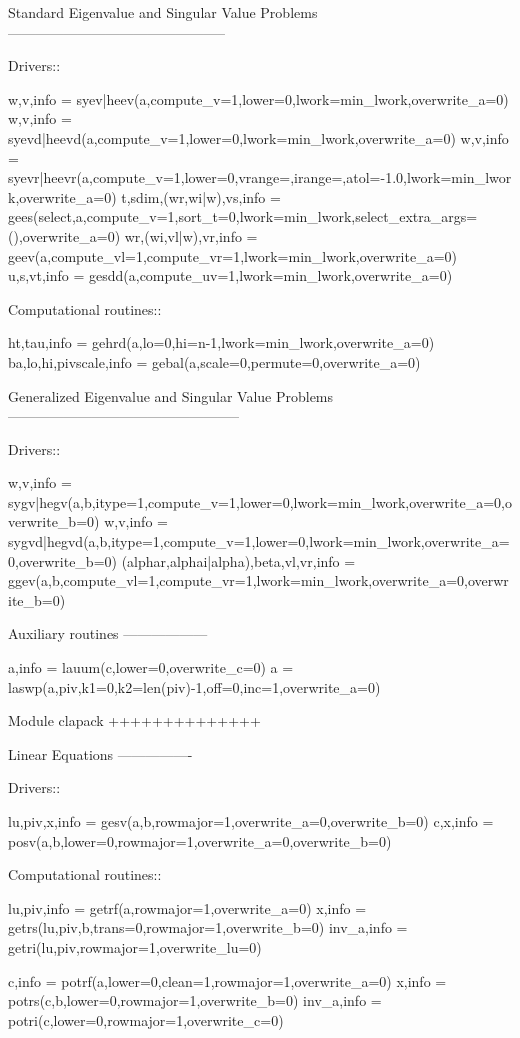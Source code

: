 \begin{DoxyVerb}
Standard Eigenvalue and Singular Value Problems
-----------------------------------------------

  Drivers::

    w,v,info = syev|heev(a,compute_v=1,lower=0,lwork=min_lwork,overwrite_a=0)
    w,v,info = syevd|heevd(a,compute_v=1,lower=0,lwork=min_lwork,overwrite_a=0)
    w,v,info = syevr|heevr(a,compute_v=1,lower=0,vrange=,irange=,atol=-1.0,lwork=min_lwork,overwrite_a=0)
    t,sdim,(wr,wi|w),vs,info = gees(select,a,compute_v=1,sort_t=0,lwork=min_lwork,select_extra_args=(),overwrite_a=0)
    wr,(wi,vl|w),vr,info = geev(a,compute_vl=1,compute_vr=1,lwork=min_lwork,overwrite_a=0)
    u,s,vt,info = gesdd(a,compute_uv=1,lwork=min_lwork,overwrite_a=0)

  Computational routines::

    ht,tau,info = gehrd(a,lo=0,hi=n-1,lwork=min_lwork,overwrite_a=0)
    ba,lo,hi,pivscale,info = gebal(a,scale=0,permute=0,overwrite_a=0)

Generalized Eigenvalue and Singular Value Problems
--------------------------------------------------

  Drivers::

    w,v,info = sygv|hegv(a,b,itype=1,compute_v=1,lower=0,lwork=min_lwork,overwrite_a=0,overwrite_b=0)
    w,v,info = sygvd|hegvd(a,b,itype=1,compute_v=1,lower=0,lwork=min_lwork,overwrite_a=0,overwrite_b=0)
    (alphar,alphai|alpha),beta,vl,vr,info = ggev(a,b,compute_vl=1,compute_vr=1,lwork=min_lwork,overwrite_a=0,overwrite_b=0)


Auxiliary routines
------------------

  a,info = lauum(c,lower=0,overwrite_c=0)
  a = laswp(a,piv,k1=0,k2=len(piv)-1,off=0,inc=1,overwrite_a=0)

Module clapack
++++++++++++++

Linear Equations
----------------

  Drivers::

    lu,piv,x,info = gesv(a,b,rowmajor=1,overwrite_a=0,overwrite_b=0)
    c,x,info = posv(a,b,lower=0,rowmajor=1,overwrite_a=0,overwrite_b=0)

  Computational routines::

    lu,piv,info = getrf(a,rowmajor=1,overwrite_a=0)
    x,info = getrs(lu,piv,b,trans=0,rowmajor=1,overwrite_b=0)
    inv_a,info = getri(lu,piv,rowmajor=1,overwrite_lu=0)

    c,info = potrf(a,lower=0,clean=1,rowmajor=1,overwrite_a=0)
    x,info = potrs(c,b,lower=0,rowmajor=1,overwrite_b=0)
    inv_a,info = potri(c,lower=0,rowmajor=1,overwrite_c=0)


\end{DoxyVerb}

